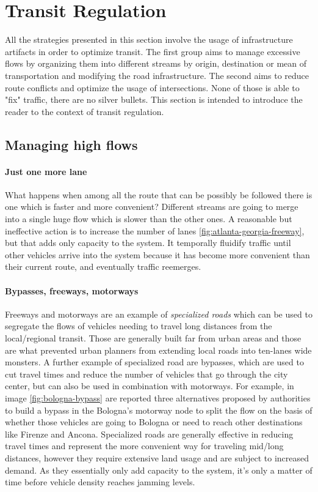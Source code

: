 \section{Transit Regulation}

All the strategies presented in this section involve the usage of infrastructure artifacts in order to optimize transit. The first group aims to manage excessive flows by organizing them into different streams by origin, destination or mean of transportation and modifying the road infrastructure. The second aims to reduce route conflicts and optimize the usage of intersections. None of those is able to "fix" traffic, there are no silver bullets. This section is intended to introduce the reader to the context of transit regulation.

\subsection{Managing high flows}

\paragraph{Just one more lane}

What happens when among all the route that can be possibly be followed there is one which is faster and more convenient? Different streams are going to merge into a single huge flow which is slower than the other ones. A reasonable but ineffective action is to increase the number of lanes \ref{fig:atlanta-georgia-freeway}, but that adds only capacity to the system. It temporally fluidify traffic until other vehicles arrive into the system because it has become more convenient than their current route, and eventually traffic reemerges.

\paragraph{Bypasses, freeways, motorways}

Freeways and motorways are an example of \textit{specialized roads} which can be used to segregate the flows of vehicles needing to travel long distances from the local/regional transit. Those are generally built far from urban areas and those are what prevented urban planners from extending local roads into ten-lanes wide monsters. A further example of specialized road are bypasses, which are used to cut travel times and reduce the number of vehicles that go through the city center, but can also be used in combination with motorways. For example, in image \ref{fig:bologna-bypass} are reported three alternatives proposed by authorities to build a bypass in the Bologna's motorway node to split the flow on the basis of whether those vehicles are going to Bologna or need to reach other destinations like Firenze and Ancona. Specialized roads are generally effective in reducing travel times and represent the more convenient way for traveling mid/long distances, however they require extensive land usage and are subject to increased demand. As they essentially only add capacity to the system, it's only a matter of time before vehicle density reaches jamming levels.

